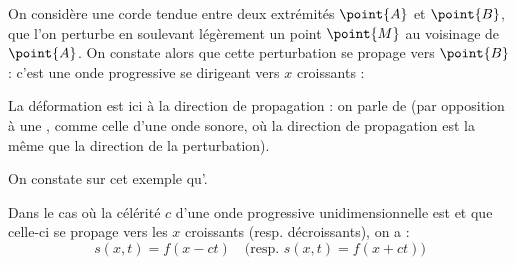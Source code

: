 \begin{exemple}
On considère une corde tendue entre deux extrémités $\point{A}$ et $\point{B}$, que l'on perturbe en soulevant légèrement un point $\point{M}$ au voisinage de $\point{A}$. On constate alors que cette perturbation se propage vers $\point{B}$ : c'est une onde progressive se dirigeant vers $x$ croissants :

\begin{figure}[H]
\begin{center}
\end{center}
\end{figure}

\noindent La déformation est ici  à la direction de propagation : on parle de  (par opposition à une , comme celle d'une onde sonore, où la direction de propagation est la même que la direction de la perturbation).
\end{exemple}

\begin{remarque}
On constate sur cet exemple qu'.
\end{remarque}

\begin{propriete}
Dans le cas où la célérité $c$ d'une onde progressive unidimensionnelle est  et que celle-ci se propage  vers les $x$ croissants (resp. décroissants), on a :
\[s(x, t) = f(x - ct) \quad \text{(resp. } s(x, t) = f(x + ct) \text{)}\]
\end{propriete}



